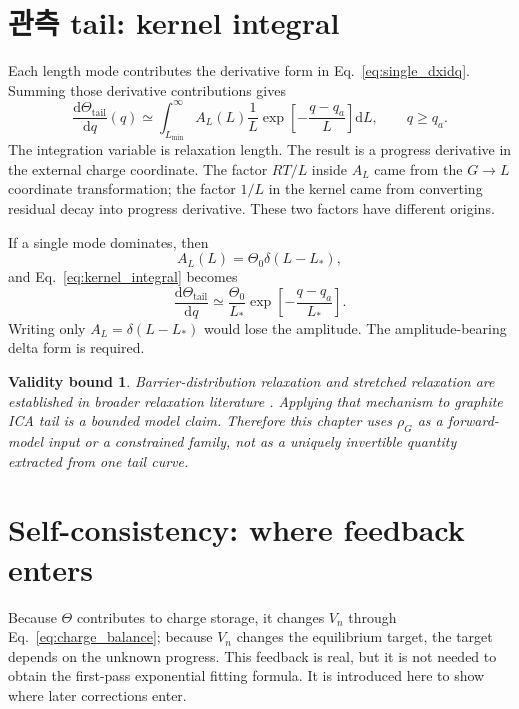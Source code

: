 \documentclass[11pt,a4paper]{article}
\newtheorem*{boundbox}{Validity bound}
\newcommand{\dd}{\mathrm{d}}
\newcommand{\tail}{\mathrm{tail}}
\begin{document}
\section{관측 tail: kernel integral}\label{sec:kernel}
Each length mode contributes the derivative form in Eq.~\eqref{eq:single_dxidq}. Summing those derivative contributions gives
\begin{equation}
\boxed{\;\frac{\dd\Theta_{\tail}}{\dd q}(q)
\simeq \int_{L_{\min}}^\infty A_L(L)\frac{1}{L}
\exp\left[-\frac{q-q_a}{L}\right]\dd L,\qquad q\ge q_a.\;}
\label{eq:kernel_integral}
\end{equation}
The integration variable is relaxation length. The result is a progress derivative in the external charge coordinate. The factor $RT/L$ inside
$A_L$ came from the $G\to L$ coordinate transformation; the factor $1/L$ in the kernel came from converting residual decay into progress
derivative. These two factors have different origins.

If a single mode dominates, then
\begin{equation}
A_L(L)=\Theta_0\delta(L-L_*),
\end{equation}
and Eq.~\eqref{eq:kernel_integral} becomes
\begin{equation}
\frac{\dd\Theta_{\tail}}{\dd q}\simeq\frac{\Theta_0}{L_*}
\exp\left[-\frac{q-q_a}{L_*}\right].
\label{eq:single_from_kernel}
\end{equation}
Writing only $A_L=\delta(L-L_*)$ would lose the amplitude. The amplitude-bearing delta form is required.

\begin{boundbox}
Barrier-distribution relaxation and stretched relaxation are established in broader relaxation literature \cite{svare2000,johnston2006,lindsey1980}.
Applying that mechanism to graphite ICA tail is a bounded model claim. Therefore this chapter uses $\rho_G$ as a forward-model input or a
constrained family, not as a uniquely invertible quantity extracted from one tail curve.
\end{boundbox}

\section{Self-consistency: where feedback enters}\label{sec:volterra}
Because $\Theta$ contributes to charge storage, it changes $V_n$ through Eq.~\eqref{eq:charge_balance}; because $V_n$ changes the equilibrium
target, the target depends on the unknown progress. This feedback is real, but it is not needed to obtain the first-pass exponential fitting formula.
It is introduced here to show where later corrections enter.
\end{document}
